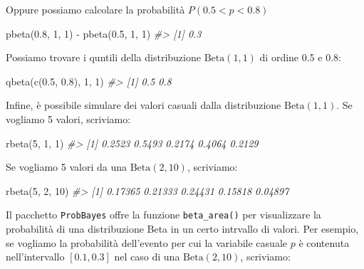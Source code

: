 \documentclass[
  11pt,
]{krantz}
\makeatletter
\newenvironment{Shaded}{\begin{snugshade}}{\end{snugshade}}
\newcommand{\CommentTok}[1]{\textcolor[rgb]{0.37,0.37,0.37}{\textit{#1}}}
\newcommand{\DecValTok}[1]{\textcolor[rgb]{0.06,0.06,0.06}{#1}}
\newcommand{\FloatTok}[1]{\textcolor[rgb]{0.06,0.06,0.06}{#1}}
\newcommand{\FunctionTok}[1]{\textcolor[rgb]{0,0,0}{#1}}
\newcommand{\NormalTok}[1]{#1}
\newcommand{\SpecialCharTok}[1]{\textcolor[rgb]{0,0,0}{#1}}
\newenvironment{kframe}{%
\medskip{}
\setlength{\fboxsep}{.8em}
 \def\at@end@of@kframe{}%
 \ifinner\ifhmode%
  \def\at@end@of@kframe{\end{minipage}}%
  \begin{minipage}{\columnwidth}%
 \fi\fi%
 \def\FrameCommand##1{\hskip\@totalleftmargin \hskip-\fboxsep
 \colorbox{shadecolor}{##1}\hskip-\fboxsep
     \hskip-\linewidth \hskip-\@totalleftmargin \hskip\columnwidth}%
 \MakeFramed {\advance\hsize-\width
   \@totalleftmargin\z@ \linewidth\hsize
   \@setminipage}}%
 {\par\unskip\endMakeFramed%
 \at@end@of@kframe}
\renewenvironment{Shaded}{\begin{kframe}}{\end{kframe}}
\theoremstyle{definition}
\theoremstyle{definition}
\theoremstyle{definition}
\theoremstyle{definition}
\theoremstyle{remark}
\makeatother
\begin{document}
Oppure possiamo calcolare la probabilità \(P(0.5 < p < 0.8)\)

\begin{Shaded}
\begin{Highlighting}[]
\FunctionTok{pbeta}\NormalTok{(}\FloatTok{0.8}\NormalTok{, }\DecValTok{1}\NormalTok{, }\DecValTok{1}\NormalTok{) }\SpecialCharTok{{-}} \FunctionTok{pbeta}\NormalTok{(}\FloatTok{0.5}\NormalTok{, }\DecValTok{1}\NormalTok{, }\DecValTok{1}\NormalTok{)}
\CommentTok{\#\textgreater{} [1] 0.3}
\end{Highlighting}
\end{Shaded}

Possiamo trovare i quntili della distribuzione \(\mbox{Beta}(1, 1)\) di ordine 0.5 e 0.8:

\begin{Shaded}
\begin{Highlighting}[]
\FunctionTok{qbeta}\NormalTok{(}\FunctionTok{c}\NormalTok{(}\FloatTok{0.5}\NormalTok{, }\FloatTok{0.8}\NormalTok{), }\DecValTok{1}\NormalTok{, }\DecValTok{1}\NormalTok{)}
\CommentTok{\#\textgreater{} [1] 0.5 0.8}
\end{Highlighting}
\end{Shaded}

Infine, è possibile simulare dei valori casuali dalla distribuzione \(\mbox{Beta}(1, 1)\). Se vogliamo 5 valori, scriviamo:

\begin{Shaded}
\begin{Highlighting}[]
\FunctionTok{rbeta}\NormalTok{(}\DecValTok{5}\NormalTok{, }\DecValTok{1}\NormalTok{, }\DecValTok{1}\NormalTok{)}
\CommentTok{\#\textgreater{} [1] 0.2523 0.5493 0.2174 0.4064 0.2129}
\end{Highlighting}
\end{Shaded}

Se vogliamo 5 valori da una \(\mbox{Beta}(2, 10)\), scriviamo:

\begin{Shaded}
\begin{Highlighting}[]
\FunctionTok{rbeta}\NormalTok{(}\DecValTok{5}\NormalTok{, }\DecValTok{2}\NormalTok{, }\DecValTok{10}\NormalTok{)}
\CommentTok{\#\textgreater{} [1] 0.17365 0.21333 0.24431 0.15818 0.04897}
\end{Highlighting}
\end{Shaded}

Il pacchetto \texttt{ProbBayes} offre la funzione \texttt{beta\_area()} per visualizzare la probabilità di una distribuzione Beta in un certo intrvallo di valori. Per esempio, se vogliamo la probabilità dell'evento per cui la variabile casuale \(p\) è contenuta nell'intervallo \([0.1, 0.3]\) nel caso di una \(\mbox{Beta}(2, 10)\), scriviamo:
\end{document}
